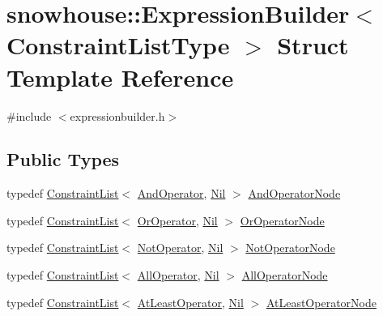 \hypertarget{structsnowhouse_1_1ExpressionBuilder}{}\section{snowhouse\+::Expression\+Builder$<$ Constraint\+List\+Type $>$ Struct Template Reference}
\label{structsnowhouse_1_1ExpressionBuilder}


{\ttfamily \#include $<$expressionbuilder.\+h$>$}

\subsection*{Public Types}
\begin{DoxyCompactItemize}
\item 
typedef \mbox{\hyperlink{structsnowhouse_1_1ConstraintList}{Constraint\+List}}$<$ \mbox{\hyperlink{structsnowhouse_1_1AndOperator}{And\+Operator}}, \mbox{\hyperlink{structsnowhouse_1_1Nil}{Nil}} $>$ \mbox{\hyperlink{structsnowhouse_1_1ExpressionBuilder_acfa4ad415e3fac4f1a161d56268a99fc}{And\+Operator\+Node}}
\item 
typedef \mbox{\hyperlink{structsnowhouse_1_1ConstraintList}{Constraint\+List}}$<$ \mbox{\hyperlink{structsnowhouse_1_1OrOperator}{Or\+Operator}}, \mbox{\hyperlink{structsnowhouse_1_1Nil}{Nil}} $>$ \mbox{\hyperlink{structsnowhouse_1_1ExpressionBuilder_a57a8b9f5c8cdc9cc9b8ae5165a515e61}{Or\+Operator\+Node}}
\item 
typedef \mbox{\hyperlink{structsnowhouse_1_1ConstraintList}{Constraint\+List}}$<$ \mbox{\hyperlink{structsnowhouse_1_1NotOperator}{Not\+Operator}}, \mbox{\hyperlink{structsnowhouse_1_1Nil}{Nil}} $>$ \mbox{\hyperlink{structsnowhouse_1_1ExpressionBuilder_a5de76f3efcd7456a66de89edc66b21a4}{Not\+Operator\+Node}}
\item 
typedef \mbox{\hyperlink{structsnowhouse_1_1ConstraintList}{Constraint\+List}}$<$ \mbox{\hyperlink{structsnowhouse_1_1AllOperator}{All\+Operator}}, \mbox{\hyperlink{structsnowhouse_1_1Nil}{Nil}} $>$ \mbox{\hyperlink{structsnowhouse_1_1ExpressionBuilder_a25ac097d527e6c4fabd98aa1334a42c6}{All\+Operator\+Node}}
\item 
typedef \mbox{\hyperlink{structsnowhouse_1_1ConstraintList}{Constraint\+List}}$<$ \mbox{\hyperlink{structsnowhouse_1_1AtLeastOperator}{At\+Least\+Operator}}, \mbox{\hyperlink{structsnowhouse_1_1Nil}{Nil}} $>$ \mbox{\hyperlink{structsnowhouse_1_1ExpressionBuilder_aaf839b9ebd0daa72220cc48bfaaea83f}{At\+Least\+Operator\+Node}}

\end{DoxyCompactItemize}

